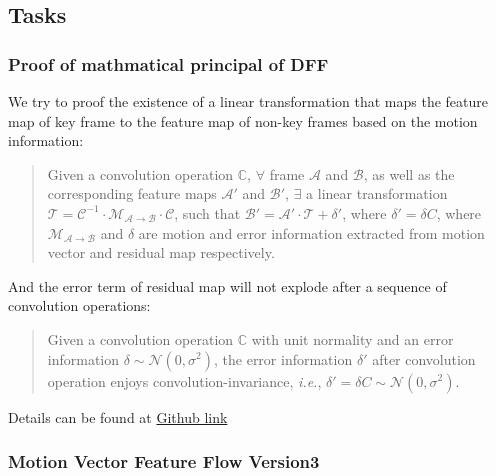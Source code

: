 \documentclass[]{article}
\begin{document}
\hypertarget{header-n1874}{%
\subsection{Tasks}\label{header-n1874}}

\hypertarget{header-n1875}{%
\subsubsection{Proof of mathmatical principal of
DFF}\label{header-n1875}}

We try to proof the existence of a linear transformation that maps the
feature map of key frame to the feature map of non-key frames based on
the motion information:

\begin{quote}
Given a convolution operation \(\mathbb{C}\), \(\forall\) frame
\(\mathcal{A}\) and \(\mathcal{B}\), as well as the corresponding
feature maps \(\mathcal{A'}\) and \(\mathcal{B'}\), \(\exists\) a linear
transformation
\(\mathcal{T} = \mathcal{C}^{-1}\cdot \mathcal{M}_{\mathcal{A} \to \mathcal{B}} \cdot \mathcal{C}\),
such that
\(\mathcal{B'} = \mathcal{A'} \cdot \mathcal{T} + \mathcal{\delta'}\),
where \(\mathcal{\delta'} = \mathcal{\delta}C\), where
\(\mathcal{M}_{\mathcal{A} \to \mathcal{B}}\) and \(\mathcal{\delta}\)
are motion and error information extracted from motion vector and
residual map respectively.
\end{quote}

And the error term of residual map will not explode after a sequence of
convolution operations:

\begin{quote}
Given a convolution operation \(\mathbb{C}\) with unit normality and an
error information \(\delta \sim \mathcal{N}(0, \sigma^2)\), the error
information \(\delta'\) after convolution operation enjoys
convolution-invariance, \emph{i.e.},
\(\delta' = \delta C \sim \mathcal{N}(0, \sigma^2)\).
\end{quote}

Details can be found at
\href{https://github.com/OrdinaryCrazy/cnn-compiler-notebook/blob/master/weekly-report/Rivulet_Proof.pdf}{Github
link}

\hypertarget{header-n1883}{%
\subsubsection{Motion Vector Feature Flow Version3}\label{header-n1883}}
\end{document}

